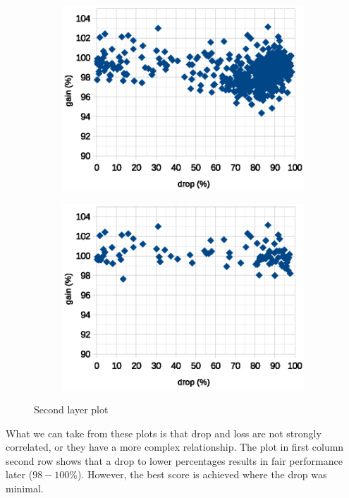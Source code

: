 \documentclass[12pt]{report}
\begin{document}
\begin{figure}[h!]
\begin{subfigure}[b]{0.49\linewidth}
		\includegraphics[scale=0.7]{dia/all_second.eps}
	\end{subfigure}
	\begin{subfigure}[b]{0.49\linewidth}
		\centering
		\includegraphics[scale=0.7]{dia/best_second.eps}
	\end{subfigure}
	\caption{Second layer plot}
	\label{second_layer}
\end{figure}

What we can take from these plots is that drop and loss are not strongly correlated, or they have a more complex relationship. The plot in first column second row shows that a drop to lower percentages results in fair performance later ($98-100\%$). However, the best score is achieved where the drop was minimal.
\end{document}
